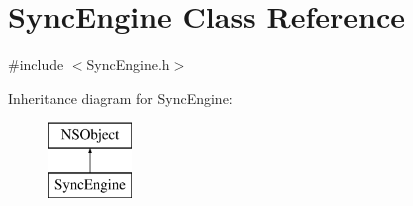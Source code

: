 \hypertarget{interface_sync_engine}{
\section{\-Sync\-Engine \-Class \-Reference}
\label{interface_sync_engine}
}


{\ttfamily \#include $<$\-Sync\-Engine.\-h$>$}

\-Inheritance diagram for \-Sync\-Engine\-:\begin{figure}[H]
\begin{center}
\leavevmode
\includegraphics[height=2.000000cm]{interface_sync_engine}
\end{center}
\end{figure}
